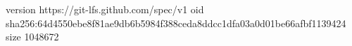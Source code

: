 version https://git-lfs.github.com/spec/v1
oid sha256:64d4550ebe8f81ae9db6b5984f388ceda8ddcc1dfa03a0d01be66afbf1139424
size 1048672
